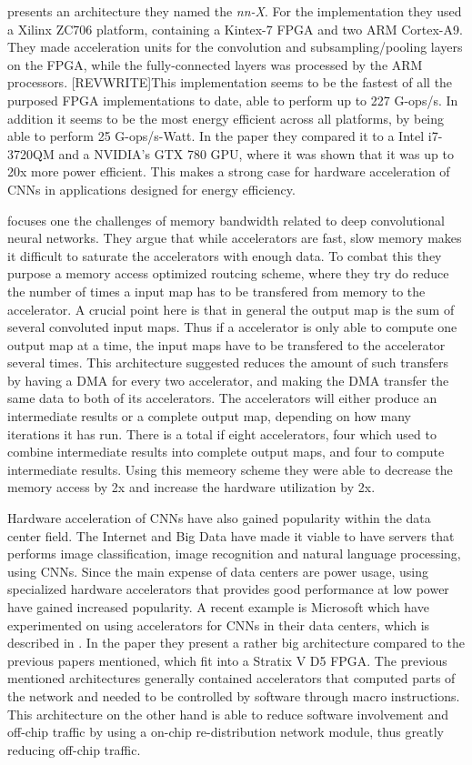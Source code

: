 \cite{Paper} presents an architecture they named the \textit{nn-X}. For the implementation they used a Xilinx ZC706 platform, containing a Kintex-7 FPGA and two ARM Cortex-A9. They made acceleration units for the convolution and subsampling/pooling layers on the FPGA, while the fully-connected layers was processed by the ARM processors. [REVWRITE]This implementation seems to be the fastest of all the purposed FPGA implementations to date, able to perform up to 227 G-ops/s. In addition it seems to be the most energy efficient across all platforms, by being able to perform 25 G-ops/s-Watt. In the paper they compared it to a Intel i7-3720QM and a NVIDIA’s GTX 780 GPU, where it was shown that it was up to 20x more power efficient. This makes a strong case for hardware acceleration of CNNs in applications designed for energy efficiency. 

\cite{INSERT_PAPER} focuses one the challenges of memory bandwidth related to deep convolutional neural networks. They argue that while accelerators are fast, slow memory makes it difficult to saturate the accelerators with enough data. To combat this they purpose a memory access optimized routcing scheme, where they try do reduce the number of times a input map has to be transfered from memory to the accelerator. A crucial point here is that in general the output map is the sum of several convoluted input maps. Thus if a accelerator is only able to compute one output map at a time, the input maps have to be transfered to the accelerator several times. This architecture suggested reduces the amount of such transfers by having a DMA for every two accelerator, and making the DMA transfer the same data to both of its accelerators. The accelerators will either produce an intermediate results or a complete output map, depending on how many iterations it has run. There is a total if eight accelerators, four which used to combine intermediate results into complete output maps, and four to compute intermediate results. Using this memeory scheme they were able to decrease the memory access by 2x and increase the hardware utilization by 2x. 

Hardware acceleration of CNNs have also gained popularity within the data center field. The Internet and Big Data have made it viable to have servers that performs image classification, image recognition and natural language processing, using CNNs. Since the main expense of data centers are power usage, using specialized hardware accelerators that provides good performance at low power have gained increased popularity. A recent example is Microsoft which have experimented on using accelerators for CNNs in their data centers, which is described in \cite{Microsoft_paper}. In the paper they present a rather big architecture compared to the previous papers mentioned, which fit into a Stratix V D5 FPGA. The previous mentioned architectures generally contained accelerators that computed parts of the network and needed to be controlled by software through macro instructions. This architecture on the other hand is able to reduce software involvement and off-chip traffic by using a on-chip re-distribution network module, thus greatly reducing off-chip traffic. 

